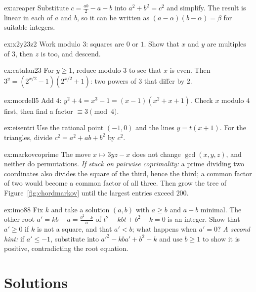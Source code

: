 \begin{hint}{ex:areaper}
Substitute $c=\frac{ab}2-a-b$ into $a^2+b^2=c^2$ and simplify. The result is linear in each of $a$ and $b$, so it can be written as $(a-\alpha)(b-\alpha)=\beta$ for suitable integers.
\end{hint}
\begin{hint}{ex:x2y23z2}
Work modulo $3$: squares are $0$ or $1$. Show that $x$ and $y$ are multiples of $3$, then $z$ is too, and descend.
\end{hint}
\begin{hint}{ex:catalan23}
For $y\ge1$, reduce modulo $3$ to see that $x$ is even. Then $3^y=(2^{x/2}-1)(2^{x/2}+1)$: two powers of $3$ that differ by $2$.
\end{hint}
\begin{hint}{ex:mordell5}
Add $4$: $y^2+4=x^3-1=(x-1)(x^2+x+1)$. Check $x$ modulo $4$ first, then find a factor $\equiv3\pmod4$.
\end{hint}
\begin{hint}{ex:eisentri}
Use the rational point $(-1,0)$ and the lines $y=t(x+1)$. For the triangles, divide $c^2=a^2+ab+b^2$ by $c^2$.
\end{hint}
\begin{hint}{ex:markovcoprime}
The move $x\mapsto3yz-x$ does not change $\gcd(x,y,z)$, and neither do permutations. \emph{If stuck on pairwise coprimality:} a prime dividing two coordinates also divides the square of the third, hence the third; a common factor of two would become a common factor of all three. Then grow the tree of Figure~\ref{fig:chordmarkov} until the largest entries exceed $200$.
\end{hint}
\begin{hint}{ex:imo88}
Fix $k$ and take a solution $(a,b)$ with $a\ge b$ and $a+b$ minimal. The other root $a'=kb-a=\frac{b^2-k}a$ of $t^2-kbt+b^2-k=0$ is an integer. Show that $a'\ge0$ if $k$ is not a square, and that $a'<b$; what happens when $a'=0$? \emph{A second hint:} if $a'\le-1$, substitute into $a'^2-kba'+b^2-k$ and use $b\ge1$ to show it is positive, contradicting the root equation.
\end{hint}

\section{Solutions}

